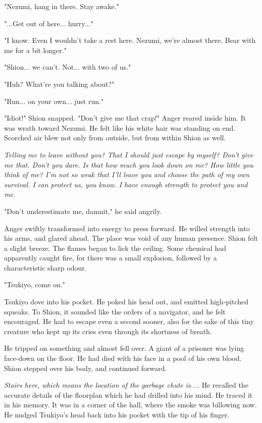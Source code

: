 "Nezumi, hang in there. Stay awake."

"...Get out of here... hurry..."

"I know. Even I wouldn't take a rest here. Nezumi, we're almost there.
Bear with me for a bit longer."

"Shion... we can't. Not... with two of us."

"Huh? What're you talking about?"

"Run... on your own... just run."

"Idiot!" Shion snapped. "Don't give me that crap!" Anger reared inside
him. It was wrath toward Nezumi. He felt like his white hair was
standing on end. Scorched air blew not only from outside, but from
within Shion as well.

\emph{Telling me to leave without you? That I should just escape by myself?
Don't give me that. Don't you dare. Is that how much you look down on
me? How little you think of me? I'm not so weak that I'll leave you and
choose the path of my own survival. I can protect us, you know. I have
enough strength to protect you and me.}

"Don't underestimate me, damnit," he said angrily.

Anger swiftly transformed into energy to press forward. He willed
strength into his arms, and glared ahead. The place was void of any
human presence. Shion felt a slight breeze. The flames began to lick the
ceiling. Some chemical had apparently caught fire, for there was a small
explosion, followed by a characteristic sharp odour.

"Tsukiyo, come on."

Tsukiyo dove into his pocket. He poked his head out, and emitted
high-pitched squeaks. To Shion, it sounded like the orders of a
navigator, and he felt encouraged. He had to escape even a second
sooner, also for the sake of this tiny creature who kept up its cries
even through its shortness of breath.

He tripped on something and almost fell over. A giant of a prisoner was
lying face-down on the floor. He had died with his face in a pool of his
own blood. Shion stepped over his body, and continued forward.

\emph{Stairs here, which means the location of the garbage chute is....} He
recalled the accurate details of the floorplan which he had drilled into
his mind. He traced it in his memory. It was in a corner of the hall,
where the smoke was billowing now. He nudged Tsukiyo's head back into
his pocket with the tip of his finger.

